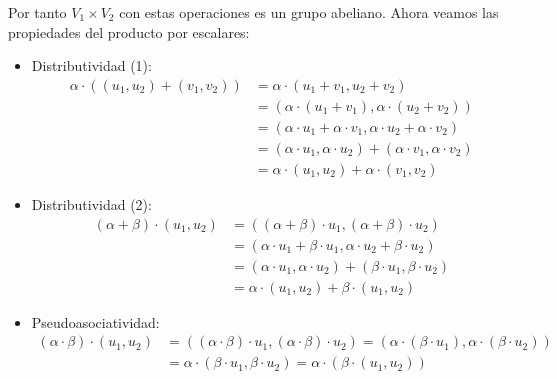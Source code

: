 \begin{ejercicio}
\begin{enumerate}
\begin{itemize}
		      \end{itemize}
		      Por tanto $V_1 \times V_2$ con estas operaciones es un grupo abeliano. Ahora veamos las propiedades del producto por escalares:
		      \begin{itemize}
			      \item Distributividad (1):
			            \begin{align*}
				            \alpha \cdot ((u_1,u_2) + (v_1,v_2)) & = \alpha \cdot (u_1 + v_1,u_2 + v_2)                                        \\
				                                                 & = (\alpha \cdot (u_1 + v_1),\alpha \cdot (u_2 + v_2))                       \\
				                                                 & = (\alpha \cdot u_1 + \alpha \cdot v_1,\alpha \cdot u_2 + \alpha \cdot v_2) \\
				                                                 & = (\alpha \cdot u_1,\alpha \cdot u_2) + (\alpha \cdot v_1,\alpha \cdot v_2) \\
				                                                 & = \alpha \cdot (u_1,u_2) + \alpha \cdot (v_1,v_2)
			            \end{align*}
			      \item Distributividad (2):
			            \begin{align*}
				            (\alpha + \beta) \cdot (u_1,u_2) & = ((\alpha + \beta) \cdot u_1,(\alpha + \beta) \cdot u_2)                 \\
				                                             & = (\alpha \cdot u_1 + \beta \cdot u_1,\alpha \cdot u_2 + \beta \cdot u_2) \\
				                                             & = (\alpha \cdot u_1,\alpha \cdot u_2) + (\beta \cdot u_1,\beta \cdot u_2) \\ & = \alpha \cdot (u_1,u_2) + \beta \cdot (u_1,u_2)
			            \end{align*}
			      \item Pseudoasociatividad:
			            \begin{align*}
				            (\alpha \cdot \beta) \cdot (u_1,u_2) & = ((\alpha \cdot \beta) \cdot u_1,(\alpha \cdot \beta) \cdot u_2) = (\alpha \cdot (\beta \cdot u_1),\alpha \cdot (\beta \cdot u_2)) \\
				                                                 & = \alpha \cdot (\beta \cdot u_1,\beta \cdot u_2) = \alpha \cdot (\beta \cdot (u_1,u_2))
			            \end{align*}

\end{itemize}
\end{enumerate}
\end{ejercicio}
